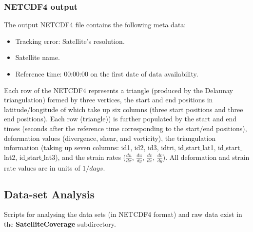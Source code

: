 \documentclass[12pt]{article}
\newcommand{\ode}[2]{\frac{d #1}{d #2}}
\begin{document}
\subsubsection*{NETCDF4 output}

The output NETCDF4 file contains the following meta data:

\begin{itemize}
    \item Tracking error: Satellite's resolution.
    \item Satellite name.
    \item Reference time: 00:00:00 on the first date of data availability.
\end{itemize}

Each row of the NETCDF4 represents a triangle (produced by the Delaunay triangulation) formed by three vertices, the start and end positions in latitude/longitude of which take up six columns (three start positions and three end positions). Each row (triangle)) is further populated by the start and end times (seconds after the reference time corresponding to the start/end positions), deformation values (divergence, shear, and vorticity), the triangulation information (taking up seven columns: id1, id2, id3, idtri, id$\_$start$\_$lat1, id$\_$start$\_$lat2, id$\_$start$\_$lat3), and the strain rates ($\ode{u}{x}$, $\ode{u}{y}$, $\ode{v}{x}$, $\ode{v}{y}$). All deformation and strain rate values are in units of $1/days$.

\subsection{Data-set Analysis}\label{structure}

Scripts for analysing the data sets (in NETCDF4 format) and raw data exist in the \textbf{SatelliteCoverage} subdirectory. 
\end{document}
